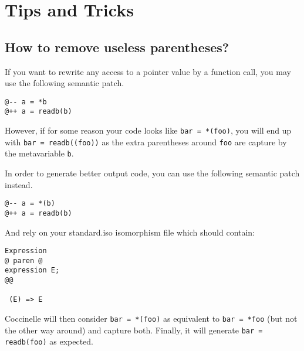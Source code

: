 
\section{Tips and Tricks}

\subsection{How to remove useless parentheses?}

If you want to rewrite any access to a pointer value by a function
call, you may use the following semantic patch.

\begin{lstlisting}[language=Cocci]
@-- a = *b
@++ a = readb(b)
\end{lstlisting}

However, if for some reason your code looks like \verb|bar = *(foo)|,
you will end up with \verb|bar = readb((foo))| as the extra
parentheses around \texttt{foo} are capture by the metavariable
\texttt{b}.

In order to generate better output code, you can use the following
semantic patch instead.
\begin{lstlisting}[language=Cocci]
@-- a = *(b)
@++ a = readb(b)
\end{lstlisting}

\noindent
And rely on your standard.iso isomorphism file which should contain:
\begin{lstlisting}[language=Cocci]
Expression
@ paren @
expression E;
@@

 (E) => E
\end{lstlisting}

Coccinelle will then consider \verb|bar = *(foo)| as equivalent to
\verb|bar = *foo| (but not the other way around) and capture both.
Finally, it will generate \verb|bar = readb(foo)| as expected.

